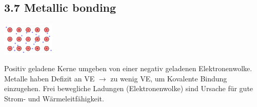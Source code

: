 \subsection{3.7 Metallic bonding}
    \begin{minipage}{25mm}
        \includegraphics[width=2.5cm]{src/3_Chemical_bondings/images/Metallische Bindung.png}
    \end{minipage}
    \begin{minipage}{42mm}
        Positiv geladene Kerne umgeben von einer negativ geladenen Elektronenwolke. Metalle haben
        Defizit an VE $\rightarrow$ zu wenig VE, um Kovalente Bindung einzugehen. Frei bewegliche Ladungen 
        (Elektronenwolke) sind Ursache für gute Strom- und Wärmeleitfähigkeit.
    \end{minipage}